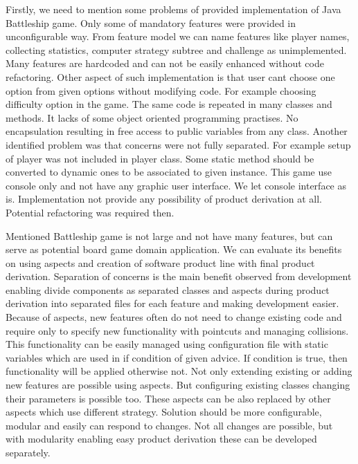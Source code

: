 \documentclass[11pt,slovak,a4paper,twoside]{article}
\begin{document}
Firstly, we need to mention some problems of provided implementation of Java Battleship game. Only some of mandatory features were provided in unconfigurable way. From feature model we can name features like player names, collecting statistics, computer strategy subtree and challenge as unimplemented. Many features are hardcoded and can not be easily enhanced without code refactoring. Other aspect of such implementation is that user cant choose one option from given options without modifying code. For example choosing difficulty option in the game. The same code is repeated in many classes and methods. It lacks of some object oriented programming practises. No encapsulation resulting in free access to public variables from any class. Another identified problem was that concerns were not fully separated. For example setup of player was not included in player class. Some static method should be converted to dynamic ones to be associated to given instance. This game use console only and not have any graphic user interface. We let console interface as is. Implementation not provide any possibility of product derivation at all. Potential refactoring was required then. 

Mentioned Battleship game is not large and not have many features, but can serve as potential board game domain application. We can evaluate its benefits on using aspects and creation of software product line with final product derivation. Separation of concerns is the main benefit observed from development enabling divide components as separated classes and aspects during product derivation into separated files for each feature and making development easier. Because of aspects, new features often do not need to change existing code and require only to specify new functionality with pointcuts and managing collisions. This functionality can be easily managed using configuration file with static variables which are used in if condition of given advice. If condition is true, then functionality will be applied otherwise not. Not only extending existing or adding new features are possible using aspects. But configuring existing classes changing their parameters is possible too. These aspects can be also replaced by other aspects which use different strategy. Solution should be more configurable, modular and easily can respond to changes. Not all changes are possible, but with modularity enabling easy product derivation these can be developed separately.
\end{document}
